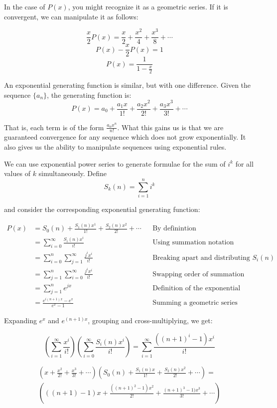 \documentclass{article}
\begin{document}
In the case of $P(x)$, you might recognize it as a geometric series. If it is convergent,
we can manipulate it as follows:

\[ \frac{x}{2} P(x) = \frac{x}{2} + \frac{x^2}{4} + \frac{x^3}{8} + \cdots \]
\[ P(x) - \frac{x}{2} P(x) = 1 \]
\[ P(x) = \frac{1}{1-\frac{x}{2}} \]

An exponential generating function is similar, but with one difference. Given the sequence
$\{a_n\}$, the generating function is:
\[ P(x) = a_0 + \frac{a_1x}{1!} + \frac{a_2x^2}{2!} + \frac{a_3x^3}{3!} + \cdots \]

That is, each term is of the form $\frac{a_nx^n}{n!}$. What this gains us is that we are
guaranteed convergence for any sequence which does not grow exponentially. It also gives
us the ability to manipulate sequences using exponential rules.

We can use exponential power series to generate formulae for the sum of $i^k$ for all
values of $k$ simultaneously. Define
\[ S_k(n) = \sum_{i=1}^{n} i^k \]

and consider the corresponding exponential generating function:

\begin{align*}
	P(x) &= S_0(n) + \frac{S_1(n)x^1}{1!} + \frac{S_2(n)x^2}{2!} + \cdots 
	&  & \text{By definintion} \\
	&= \sum_{i=0}^{\infty} \frac{S_i(n)x^i}{i!} &  & \text{Using summation notation} \\
	&= \sum_{i=0}^{n} \sum_{j=1}^{\infty} \frac{j^ix^i}{i!} &  & 
	\text{Breaking apart and distributing } S_i(n) \\
	&= \sum_{j=1}^{n} \sum_{i=0}^{\infty} \frac{j^ix^i}{i!} &  & 
	\text{Swapping order of summation} \\
	&= \sum_{j=1}^{n} e^{jx} &  & \text{Definition of the exponential function} \\
	&= \frac{e^{i(n+1)x}-e^x}{e^{x}-1} &  & \text{Summing a geometric series}
\end{align*}

Expanding $e^x$ and $e^{(n+1)x}$, grouping and cross-multiplying, we get:

\[ \left( \sum_{i=1}^{\infty} \frac{x^i}{i!} \right) 
	\left( \sum_{i=0}^{\infty} \frac{S_i(n)x^i}{i!}\right) = 
	\sum_{i=1}^{\infty} \frac{((n+1)^i - 1)x^i}{i!} \]

\begin{multline*}
	\left( x+\frac{x^2}{2!} + \frac{x^3}{3!} + \cdots \right)
	\left( S_0(n) + \frac{S_1(n)x}{1!} + \frac{S_2(n)x^2}{2!} + \cdots \right) = \\
	\left( ((n+1) - 1)x+\frac{((n+1)^2-1)x^2}{2!} + \frac{(n+1)^3-1)x^3}{3!} + \cdots \right)
\end{multline*}
\end{document}
